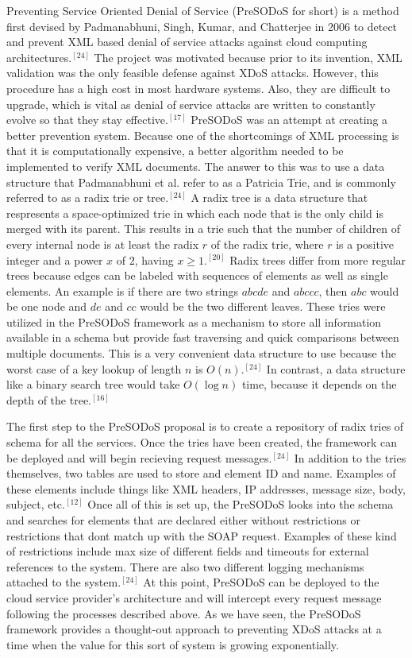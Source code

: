 \documentclass[a4paper, 8pt]{article} %
\begin{document}
\begin{doublespacing}
Preventing Service Oriented Denial of Service (PreSODoS for short) is a method first devised by Padmanabhuni, Singh, Kumar, and Chatterjee in 2006 to detect and prevent XML based denial of service attacks against cloud computing architectures.$^{[24]}$  The project was motivated because prior to its invention, XML validation was the only feasible defense against XDoS attacks.  However, this procedure has a high cost in most hardware systems.  Also, they are difficult to upgrade, which is vital as denial of service attacks are written to constantly evolve so that they stay effective.$^{[17]}$  PreSODoS was an attempt at creating a better prevention system.  Because one of the shortcomings of XML processing is that it is computationally expensive, a better algorithm needed to be implemented to verify XML documents.  The answer to this was to use a data structure that Padmanabhuni et al. refer to as a Patricia Trie, and is commonly referred to as a radix trie or tree.$^{[24]}$  A radix tree is a data structure that respresents a space-optimized trie in which each node that is the only child is merged with its parent.  This results in a trie such that the number of children of every internal node is at least the radix $r$ of the radix trie, where $r$ is a positive integer and a power $x$ of $2$, having $x \geq 1$.$^{[20]}$  Radix trees differ from more regular trees because edges can be labeled with sequences of elements as well as single elements.  An example is if there are two strings $abcde$ and $abccc$, then $abc$ would be one node and $de$ and $cc$ would be the two different leaves.  These tries were utilized in the PreSODoS framework as a mechanism to store all information available in a schema but provide fast traversing and quick comparisons between multiple documents.  This is a very convenient data structure to use because the worst case of a key lookup of length $n$ is $O(n)$.$^{[24]}$  In contrast, a data structure like a binary search tree would take $O(\log n)$ time, because it depends on the depth of the tree.$^{[16]}$  

The first step to the PreSODoS proposal is to create a repository of radix tries of schema for all the services.  Once the tries have been created, the framework can be deployed and will begin recieving request messages.$^{[24]}$  In addition to the tries themselves, two tables are used to store and element ID and name.  Examples of these elements include things like XML headers, IP addresses, message size, body, subject, etc.$^{[12]}$  Once all of this is set up, the PreSODoS looks into the schema and searches for elements that are declared either without restrictions or restrictions that dont match up with the SOAP request.  Examples of these kind of restrictions include max size of different fields and timeouts for external references to the system.  There are also two different logging mechanisms attached to the system.$^{[24]}$  At this point, PreSODoS can be deployed to the cloud service provider's architecture and will intercept every request message following the processes described above.  As we have seen, the PreSODoS framework provides a thought-out approach to preventing XDoS attacks at a time when the value for this sort of system is growing exponentially.  


\end{doublespacing}
\end{document}
